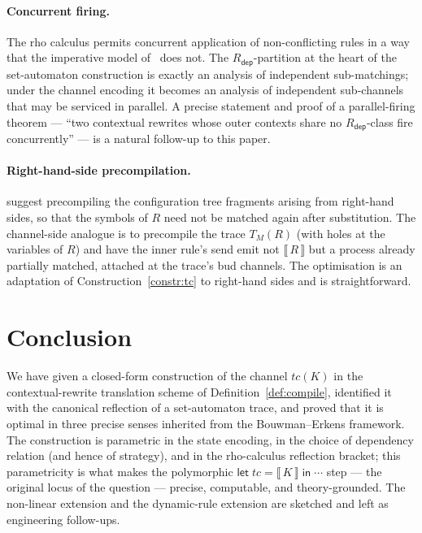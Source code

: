 \documentclass[11pt]{article}
\theoremstyle{plain}
\theoremstyle{definition}
\theoremstyle{remark}
\newcommand{\sem}[1]{\llbracket\,#1\,\rrbracket}
\newcommand{\rdep}{R_{\mathsf{dep}}}
\newcommand{\Let}[3]{\mathsf{let}\;#1 = #2\;\mathsf{in}\;#3}
\begin{document}
\paragraph{Concurrent firing.}
The rho calculus permits concurrent application of non-conflicting rules
in a way that the imperative model of~\cite{BouwmanErkens2022} does not.
The $\rdep$-partition at the heart of the set-automaton construction is
exactly an analysis of independent sub-matchings; under the channel
encoding it becomes an analysis of independent sub-channels that may be
serviced in parallel. A precise statement and proof of a
parallel-firing theorem --- ``two contextual rewrites whose outer contexts
share no $\rdep$-class fire concurrently'' --- is a natural follow-up to
this paper.

\paragraph{Right-hand-side precompilation.}
\cite[\S 8]{BouwmanErkens2022} suggest precompiling the configuration
tree fragments arising from right-hand sides, so that the symbols of $R$
need not be matched again after substitution. The channel-side analogue
is to precompile the trace $T_{M}(R)$ (with holes at the variables of
$R$) and have the inner rule's send emit not $\sem{R}$ but a process
already partially matched, attached at the trace's bud channels. The
optimisation is an adaptation of Construction~\ref{constr:tc} to
right-hand sides and is straightforward.

\section{Conclusion}\label{sec:conclusion}

We have given a closed-form construction of the channel $tc(K)$ in the
contextual-rewrite translation scheme of Definition~\ref{def:compile},
identified it with the canonical reflection of a set-automaton trace, and
proved that it is optimal in three precise senses inherited from the
Bouwman--Erkens framework. The construction is parametric in the state
encoding, in the choice of dependency relation (and hence of strategy),
and in the rho-calculus reflection bracket; this parametricity is what
makes the polymorphic $\Let{tc}{\sem{K}}{\cdots}$ step --- the original
locus of the question --- precise, computable, and theory-grounded. The
non-linear extension and the dynamic-rule extension are sketched and left
as engineering follow-ups.
\end{document}
